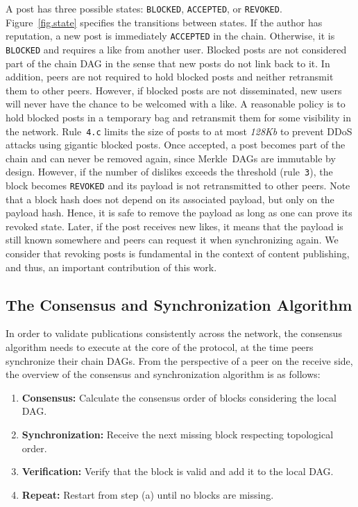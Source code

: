 \documentclass[10pt,journal,compsoc]{IEEEtran}
\newcommand{\code}[1]  {\texttt{\footnotesize{#1}}}
\begin{document}
A post has three possible states: \code{BLOCKED}, \code{ACCEPTED}, or
\code{REVOKED}.
Figure~\ref{fig.state} specifies the transitions between states.
%
If the author has reputation, a new post is immediately \code{ACCEPTED} in the
chain.
%
Otherwise, it is \code{BLOCKED} and requires a like from another user.
Blocked posts are not considered part of the chain DAG in the sense that new
posts do not link back to it.
In addition, peers are not required to hold blocked posts and neither
retransmit them to other peers.
However, if blocked posts are not disseminated, new users will never have the
chance to be welcomed with a like.
A reasonable policy is to hold blocked posts in a temporary bag and retransmit
them for some visibility in the network.
Rule~\code{4.c} limits the size of posts to at most \emph{128Kb} to prevent
DDoS attacks using gigantic blocked posts.
%
Once accepted, a post becomes part of the chain and can never be removed
again, since Merkle~DAGs are immutable by design.
%
However, if the number of dislikes exceeds the threshold (rule~\code{3}), the
block becomes \code{REVOKED} and its payload is not retransmitted to other
peers.
Note that a block hash does not depend on its associated payload, but only on
the payload hash.
Hence, it is safe to remove the payload as long as one can prove its revoked
state.
Later, if the post receives new likes, it means that the payload is still known
somewhere and peers can request it when synchronizing again.
We consider that revoking posts is fundamental in the context of content
publishing, and thus, an important contribution of this work.

\subsection{The Consensus and Synchronization Algorithm}
\label{sec.consensus.algo}

In order to validate publications consistently across the network, the
consensus algorithm needs to execute at the core of the protocol, at the time
peers synchronize their chain DAGs.
From the perspective of a peer on the receive side, the overview of the
consensus and synchronization algorithm is as follows:
\begin{enumerate}
\item \textbf{Consensus:}
    Calculate the consensus order of blocks considering the local DAG.
\item \textbf{Synchronization:}
    Receive the next missing block respecting topological order.
\item \textbf{Verification:}
    Verify that the block is valid and add it to the local DAG.
\item \textbf{Repeat:}
    Restart from step (a) until no blocks are missing.
\end{enumerate}
\end{document}
